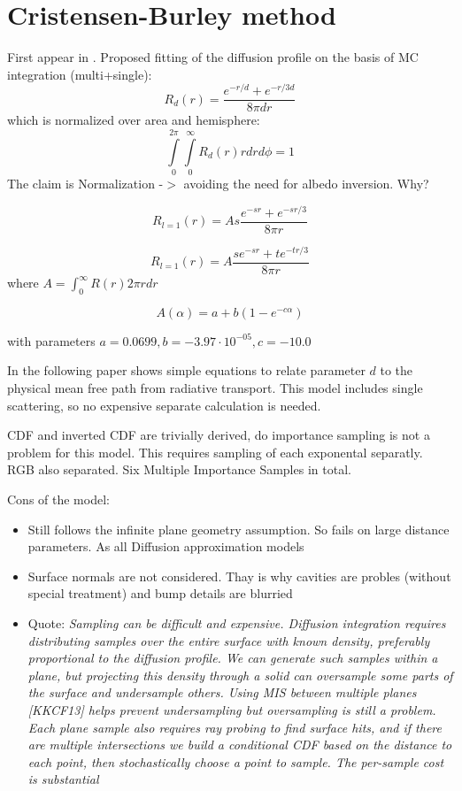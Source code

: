 \section{Cristensen-Burley method}

First appear in \cite{Burley:disney_siggraph15}. Proposed fitting of the
diffusion profile on the basis of MC integration (multi+single):
\[
R_d(r) = \dfrac{e^{-r/d}+e^{-r/3d}}{8\pi dr}
\]
which is normalized over area and hemisphere:
\[
\int\limits_0^{2\pi}\int\limits_0^\infty R_d(r)rdrd\phi = 1
\]
The claim is Normalization -$>$ avoiding the need for albedo inversion. Why?

\[
R_{l=1}(r) = As\dfrac{e^{-sr}+e^{-sr/3}}{8\pi r}
\]

\[
R_{l=1}(r) = A\dfrac{se^{-sr}+te^{-tr/3}}{8\pi r}
\]
where $A=\int_0^{\infty} R(r)2\pi rdr$

\[
A(\alpha) = a + b(1- e^{-c\alpha})
\]

with parameters $a = 0.0699, b = -3.97\cdot 10^{-05}, c =
-10.0$

In the following paper \cite{Christensen:2015:ARP:2775280.2792555} shows simple
equations to relate parameter $d$ to the physical mean free path from radiative
transport. This model includes single scattering, so no expensive separate
calculation is needed.

CDF and inverted CDF are trivially derived, do importance sampling is not a
problem for this model. This requires sampling of each exponental separatly. RGB
also separated. Six Multiple Importance Samples in total.

Cons of the model:
\begin{itemize}
  \item {Still follows the infinite plane geometry assumption. So fails on
  large distance parameters. As all Diffusion approximation models}
  \item {Surface normals are not considered. Thay is why cavities are probles
  (without special treatment) and bump details are blurried}
  \item{Quote: \textit{Sampling can be difficult and expensive. Diffusion
  integration requires distributing samples over the entire surface with known
  density, preferably proportional to the diffusion profile. We can generate
  such samples within a plane, but projecting this density through a solid can
  oversample some parts of the surface and undersample others. Using MIS between
  multiple planes [KKCF13] helps prevent undersampling but oversampling is still
  a problem. Each plane sample also requires ray probing to find surface hits,
  and if there are multiple intersections we build a conditional CDF based on
  the distance to each point, then stochastically choose a point to sample. The
  per-sample cost is substantial}}
\end{itemize}